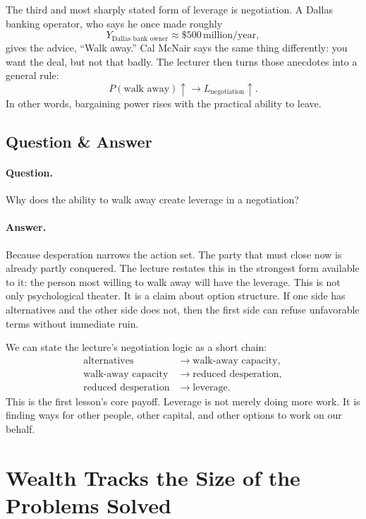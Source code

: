 The third and most sharply stated form of leverage is negotiation. A Dallas banking operator, who says he once made roughly
\begin{equation}
Y_{\text{Dallas bank owner}} \approx \$500\,\text{million/year},
\end{equation}
gives the advice, ``Walk away.'' Cal McNair says the same thing differently: you want the deal, but not that badly. The lecturer then turns those anecdotes into a general rule:
\begin{equation}
P(\text{walk away})\uparrow \to L_{\text{negotiation}}\uparrow.
\end{equation}
In other words, bargaining power rises with the practical ability to leave.

\subsection{Question \& Answer}

\paragraph{Question.} Why does the ability to walk away create leverage in a negotiation?

\paragraph{Answer.} Because desperation narrows the action set. The party that must close now is already partly conquered. The lecture restates this in the strongest form available to it: the person most willing to walk away will have the leverage. This is not only psychological theater. It is a claim about option structure. If one side has alternatives and the other side does not, then the first side can refuse unfavorable terms without immediate ruin.

We can state the lecture's negotiation logic as a short chain:
\begin{align}
\text{alternatives} &\to \text{walk-away capacity}, \\
\text{walk-away capacity} &\to \text{reduced desperation}, \\
\text{reduced desperation} &\to \text{leverage}.
\end{align}
This is the first lesson's core payoff. Leverage is not merely doing more work. It is finding ways for other people, other capital, and other options to work on our behalf.

\section{Wealth Tracks the Size of the Problems Solved}

